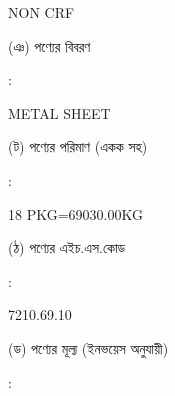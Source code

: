 \documentclass[12pt]{article}
\newcommand{\good}{METAL SHEET}
\newcommand{\pkg}{18 PKG=69030.00KG}
\newcommand{\crf}{NON CRF}
\newcommand{\crfdt}{}
\newcommand{\hscode}{7210.69.10}
\begin{document}
\begin{minipage}[t]{0.50\linewidth}
{\crf} \hspace{2em} {\crfdt}
\\
\end{minipage}
\begin{minipage}[t]{0.05\linewidth}
\hspace*{1em}
\end{minipage}
\begin{minipage}[t]{0.45\linewidth}
(ঞ) পণ্যের বিবরণ
\end{minipage}
\begin{minipage}[t]{0.02\linewidth}
:
\end{minipage}
\begin{minipage}[t]{0.50\linewidth}
{\good}
\\
\end{minipage}
\begin{minipage}[t]{0.05\linewidth}
\hspace*{1em}
\end{minipage}
\begin{minipage}[t]{0.45\linewidth}
(ট) পণ্যের পরিমাণ (একক সহ)
\end{minipage}
\begin{minipage}[t]{0.02\linewidth}
:
\end{minipage}
\begin{minipage}[t]{0.50\linewidth}
{\pkg}
\\
\end{minipage}
\begin{minipage}[t]{0.05\linewidth}
\hspace*{1em}
\end{minipage}
\begin{minipage}[t]{0.45\linewidth}
(ঠ) পণ্যের এইচ.এস.কোড
\end{minipage}
\begin{minipage}[t]{0.02\linewidth}
:
\end{minipage}
\begin{minipage}[t]{0.50\linewidth}
{\hscode}
\\
\end{minipage}
\begin{minipage}[t]{0.05\linewidth}
\hspace*{1em}
\end{minipage}
\begin{minipage}[t]{0.45\linewidth}
(ড) পণ্যের মূল্য (ইনভয়েস অনুযায়ী)
\end{minipage}
\begin{minipage}[t]{0.02\linewidth}
:
\end{minipage}
\end{document}
